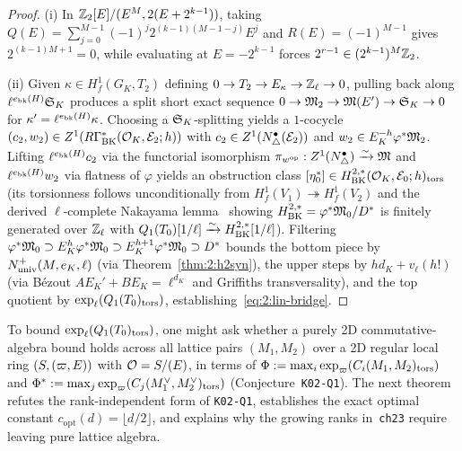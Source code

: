 \begin{proof}
(i) In $\mathbb{Z}_2[E]/(E^M, 2(E + 2^{k-1}))$, taking $Q(E) = \sum_{j=0}^{M-1}(-1)^j 2^{(k-1)(M-1-j)} E^j$ and $R(E) = (-1)^{M-1}$ gives $2^{(k-1)M+1} = 0$, while evaluating at $E = -2^{k-1}$ forces $2^{r-1} \in (2^{k-1})^M \mathbb{Z}_2$.

(ii) Given $\kappa \in H^1_f(G_K, T_2)$ defining $0 \to T_2 \to E_\kappa \to \mathbb{Z}_\ell \to 0$, pulling back along $\ell^{e_{\mathrm{bk}}(H)} \mathfrak{S}_K$ produces a split short exact sequence $0 \to \mathfrak{M}_2 \to \mathfrak{M}(E') \to \mathfrak{S}_K \to 0$ for $\kappa' = \ell^{e_{\mathrm{bk}}(H)}\kappa$. Choosing a $\mathfrak{S}_K$-splitting yields a $1$-cocycle $(c_2, w_2) \in Z^1(R\Gamma_{\mathrm{BK}}^*(\mathcal{O}_K, \mathcal{E}_2; h))$ with $c_2 \in Z^1(N^\bullet_\triangle(\mathcal{E}_2))$ and $w_2 \in E_K^{-h}\varphi^*\mathfrak{M}_2$. Lifting $\ell^{e_{\mathrm{bk}}(H)} c_2$ via the functorial isomorphism $\pi_{w^{\mathrm{op}}} : Z^1(N^\bullet_\triangle) \xrightarrow{\sim} \mathfrak{M}$ and $\ell^{e_{\mathrm{bk}}(H)} w_2$ via flatness of $\varphi$ yields an obstruction class $[\eta_0^*] \in H^{2,*}_{\mathrm{BK}}(\mathcal{O}_K, \mathcal{E}_0; h)_{\mathrm{tors}}$ (its torsionness follows unconditionally from $H^1_f(V_1) \twoheadrightarrow H^1_f(V_2)$ and the derived $\ell$-complete Nakayama lemma~\cite[Tags~091U, 09B9]{Stacks} showing $H^{2,*}_{\mathrm{BK}} = \varphi^*\mathfrak{M}_0 / D^*$ is finitely generated over $\mathbb{Z}_\ell$ with $Q_1(T_0)[1/\ell] \xrightarrow{\sim} H^{2,*}_{\mathrm{BK}}[1/\ell]$). Filtering $\varphi^*\mathfrak{M}_0 \supset E_K^h\varphi^*\mathfrak{M}_0 \supset E_K^{h+1}\varphi^*\mathfrak{M}_0 \supset D^*$ bounds the bottom piece by $N_{\mathrm{univ}}^+(M, e_K, \ell)$ (via Theorem~\ref{thm:2:h2syn}), the upper steps by $h d_K + v_\ell(h!)$ (via B\'ezout $A E_K' + B E_K = \ell^{d_K}$ and Griffiths transversality), and the top quotient by $\exp_\ell(Q_1(T_0)_{\mathrm{tors}})$, establishing~\eqref{eq:2:lin-bridge}.
\end{proof}

To bound $\exp_\ell(Q_1(T_0)_{\mathrm{tors}})$, one might ask whether a purely 2D commutative-algebra bound holds across all lattice pairs $(M_1, M_2)$ over a 2D regular local ring $(S, (\varpi, E))$ with $\mathcal{O} = S/(E)$, in terms of $\Phi := \max_i \exp_\varpi(C_i(M_1, M_2)_{\mathrm{tors}})$ and $\Phi^* := \max_j \exp_\varpi(C_j(M_1^\vee, M_2^\vee)_{\mathrm{tors}})$ (Conjecture~\texttt{K02-Q1}). The next theorem refutes the rank-independent form of \texttt{K02-Q1}, establishes the exact optimal constant $c_{\mathrm{opt}}(d) = \lfloor d/2 \rfloor$, and explains why the growing ranks in~\texttt{ch23} require leaving pure lattice algebra.

